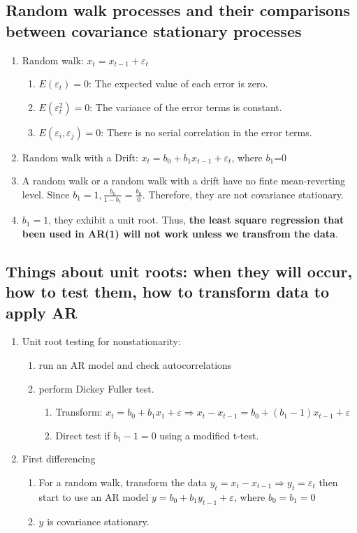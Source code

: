 \documentclass{article}
\newcommand{\be}{\begin{enumerate}}
\newcommand{\ee}{\end{enumerate}}
\begin{document}
\subsection{Random walk processes and their comparisons between covariance stationary processes}
\be
    \item Random walk: $x_t=x_{t-1}+\varepsilon_t$
    \be
        \item $E(\varepsilon_t)=0$: The expected value of each error is zero.
        \item $E(\varepsilon_t^2)=0$: The variance of the error terms is constant.
        \item $E(\varepsilon_i,\varepsilon_j)=0$: There is no serial correlation in the error terms.
    \ee
    \item Random walk with a Drift: $x_t=b_0+b_1 x_{t-1}+\varepsilon_t$, where $b_1$=0
    \item A random walk or a random walk with a drift have no finte mean-reverting level.
        Since $b_1=1,\frac{b_0}{1-b_1}=\frac{b_0}{0}$. Therefore, they are not covariance stationary.
    \item $b_1=1$, they exhibit a unit root. Thus, {\bf the least square regression that been used in 
        AR(1) will not work unless we transfrom the data}.
\ee
\subsection{Things about unit roots: when they will occur, how to test them, how to transform data to apply AR}
\be
    \item Unit root testing for nonstationarity:
        \be
            \item run an AR model and check autocorrelations
            \item perform Dickey Fuller test.
                \be
                    \item Transform: $x_t=b_0+b_1x_1+\varepsilon\Rightarrow x_t-x_{t-1}=b_0+(b_1-1)x_{t-1}+\varepsilon$
                    \item Direct test if $b_1-1=0$ using a modified t-test.    
                \ee
        \ee
    \item First differencing
        \be
            \item For a random walk, transform the data $y_t=x_t-x_{t-1}\Rightarrow y_t=\varepsilon_t$
                then start to use an AR model $y=b_0+b_1 y_{t-1}+\varepsilon$, 
                where $b_0=b_1=0$
            \item $y$ is covariance stationary.
        \ee
\ee
\end{document}
